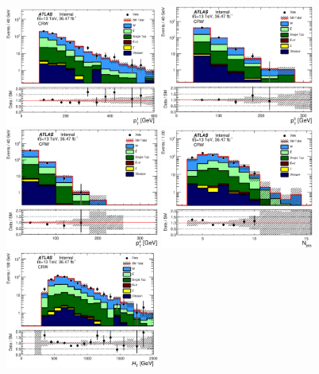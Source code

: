\begin{figure}[!htb]
  \centering
  \includegraphics[width=0.45\textwidth]{figures/wJets/postfit/JetPt_1__CRW_log.eps}
  \includegraphics[width=0.45\textwidth]{figures/wJets/postfit/JetPt_3__CRW_log.eps}
  \includegraphics[width=0.45\textwidth]{figures/wJets/postfit/JetPt_4__CRW_log.eps}
  \includegraphics[width=0.45\textwidth]{figures/wJets/postfit/NJets_CRW_log.eps}
  \includegraphics[width=0.45\textwidth]{figures/wJets/postfit/Ht_CRW_log.eps}

\end{figure}
